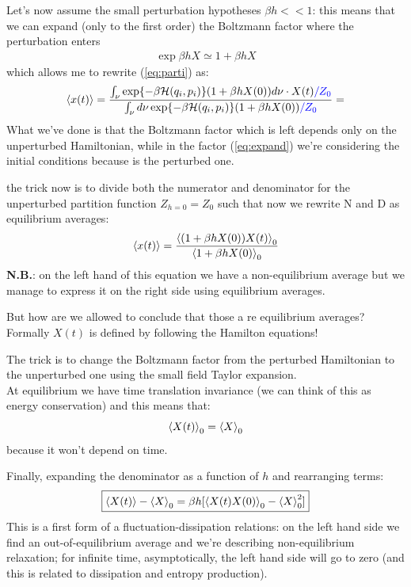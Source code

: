 \documentclass[\main/main.tex]{subfiles}
\begin{document}
Let's now assume the small perturbation hypotheses $\beta h<<1$: this means that we can expand (only to the first order) the Boltzmann factor where the perturbation enters
\begin{align}
    \exp{\beta h X}\simeq 1 + \beta h X
    \label{eq:expand}
\end{align}
which allows me to rewrite (\ref{eq:parti}) as:
\begin{align}
    \left\langle x(t) \right\rangle=\frac{\int_{\nu} \exp{-\beta\mathcal{H}(q_i,p_i)}(1+\beta h X(0))d\nu\cdot X(t)\textcolor{blue}{/Z_0}}{\int_{\nu} d\nu \exp{-\beta \mathcal{H}(q_i,p_i)}(1+\beta h X(0))\textcolor{blue}{/Z_0}}=
\end{align}
What we've done is that the Boltzmann factor which is left depends only on the unperturbed Hamiltonian, while in the factor (\ref{eq:expand}) we're considering the initial conditions because is the perturbed one.

the trick now is to divide both the numerator and denominator for the unperturbed partition function $Z_{h=0}=Z_0$ such that now we rewrite N and D as equilibrium averages:
\begin{align}
    \left\langle x(t) \right\rangle=\frac{\left\langle (1+\beta h X(0))X(t) \right\rangle_0}{\left\langle 1+\beta h X(0) \right\rangle_0}
\end{align}
\textbf{N.B.}: on the left hand of this equation we have a non-equilibrium average but we manage to express it on the right side using equilibrium averages.

But how are we allowed to conclude that those a re equilibrium averages? Formally $X(t)$ is defined by following the Hamilton equations!

The trick is to change the Boltzmann factor from the perturbed Hamiltonian to the unperturbed one using the small field Taylor expansion. \\

At equilibrium we have time translation invariance (we can think of this as energy conservation) and this means that:
\begin{equation}
    \left\langle X(t) \right\rangle_0=\left\langle X \right\rangle_0
\end{equation}
because it won't depend on time. 

Finally, expanding the denominator as a function of $h$ and rearranging terms:
\begin{equation}
    \boxed{\left\langle X(t) \right\rangle-\left\langle X \right\rangle_0=\beta h [\left\langle X(t)X(0) \right\rangle_0-\left\langle X \right\rangle_0^2]}
    \label{eq:wow}
\end{equation}
This is a first form of a fluctuation-dissipation relations: on the left hand side we find an out-of-equilibrium average and we're describing non-equilibrium relaxation; for infinite time, asymptotically, the left hand side will go to zero (and this is related to dissipation and entropy production).
\end{document}
